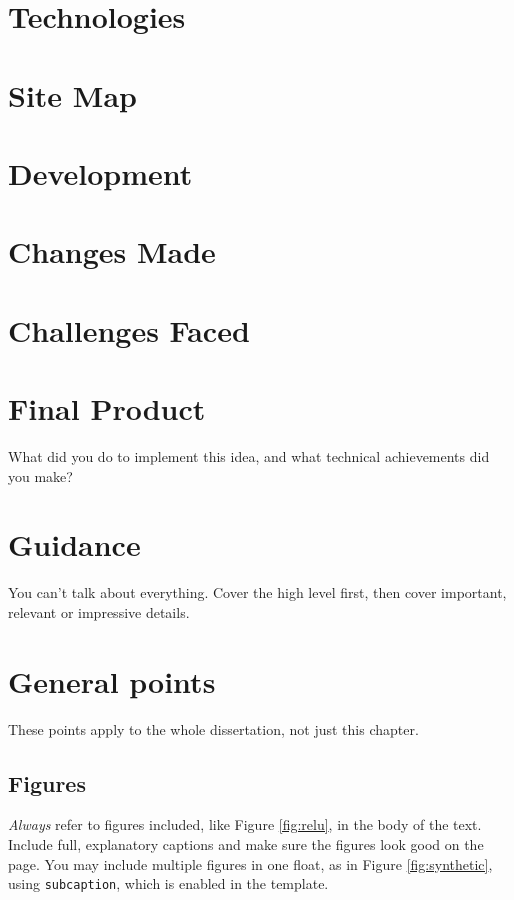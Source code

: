 \documentclass{l4proj}
\begin{document}
\section{Technologies}

\section{Site Map}

\section{Development}

\section{Changes Made}

\section{Challenges Faced}

\section{Final Product}





What did you do to implement this idea, and what technical achievements did you make?
\section{Guidance}
You can't talk about everything. Cover the high level first, then cover important, relevant or impressive details.

\section{General points}

These points apply to the whole dissertation, not just this chapter.



\subsection{Figures}
\emph{Always} refer to figures included, like Figure \ref{fig:relu}, in the body of the text. Include full, explanatory captions and make sure the figures look good on the page.
You may include multiple figures in one float, as in Figure \ref{fig:synthetic}, using \texttt{subcaption}, which is enabled in the template.
\end{document}
